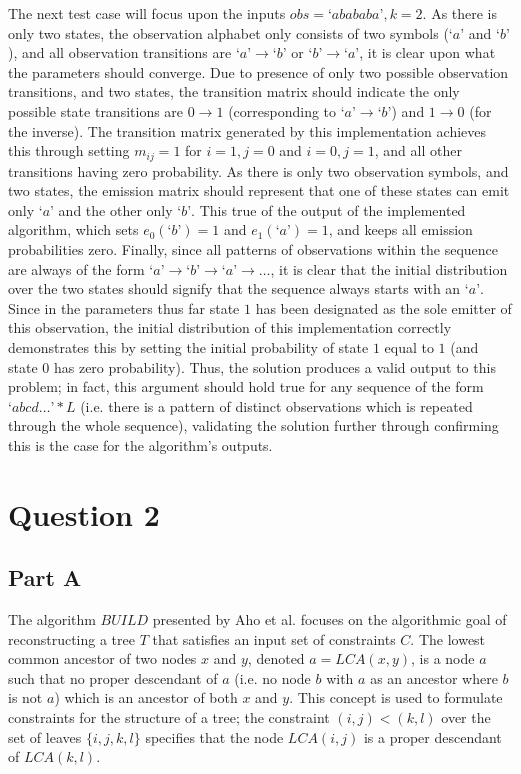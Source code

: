 \documentclass[a4paper, 11pt]{article}
\begin{document}
	The next test case will focus upon the inputs $obs = \text{`}abababa\text{'}, k = 2$. As there is only two states, the observation alphabet only consists of two symbols ($\text{`}a\text{'}$ and $\text{`}b\text{'}$), and all observation transitions are $\text{`}a\text{'} \to \text{`}b\text{'}$ or $\text{`}b\text{'} \to \text{`}a\text{'}$, it is clear upon what the parameters should converge. Due to presence of only two possible observation transitions, and two states, the transition matrix should indicate the only possible state transitions are $0 \to 1$ (corresponding to $\text{`}a\text{'} \to \text{`}b\text{'}$) and $1 \to 0$ (for the inverse). The transition matrix generated by this implementation achieves this through setting $m_{ij} = 1$ for $i = 1, j = 0$ and $i = 0, j = 1$, and all other transitions having zero probability. As there is only two observation symbols, and two states, the emission matrix should represent that one of these states can emit only $\text{`}a\text{'}$ and the other only $\text{`}b\text{'}$. This true of the output of the implemented algorithm, which sets $e_{0} \left(\text{`}b\text{'} \right) = 1$ and $e_{1} \left(\text{`}a\text{'} \right) = 1$, and keeps all emission probabilities zero. Finally, since all patterns of observations within the sequence are always of the form $\text{`}a\text{'} \to \text{`}b\text{'} \to \text{`}a\text{'} \to \ldots$, it is clear that the initial distribution over the two states should signify that the sequence always starts with an $\text{`}a\text{'}$. Since in the parameters thus far state $1$ has been designated as the sole emitter of this observation, the initial distribution of this implementation correctly demonstrates this by setting the initial probability of state $1$ equal to $1$ (and state $0$ has zero probability). Thus, the solution produces a valid output to this problem; in fact, this argument should hold true for any sequence of the form $\text{`}abcd\ldots\text{'} * L$ (i.e. there is a pattern of distinct observations which is repeated through the whole sequence), validating the solution further through confirming this is the case for the algorithm's outputs.
	
	\section{Question 2}
	\subsection{Part A}
	\label{section:2A}
	The algorithm $BUILD$ presented by Aho et al. focuses on the algorithmic goal of reconstructing a tree $T$ that satisfies an input set of constraints $C$. The lowest common ancestor of two nodes $x$ and $y$, denoted $a = LCA(x, y)$, is a node $a$ such that no proper descendant of $a$ (i.e. no node $b$ with $a$ as an ancestor where $b$ is not $a$) which is an ancestor of both $x$ and $y$. This concept is used to formulate constraints for the structure of a tree; the constraint $(i, j) < (k, l)$ over the set of leaves $\{i, j, k, l\}$ specifies that the node $LCA(i, j)$ is a proper descendant of $LCA(k, l)$.
	
\end{document}
